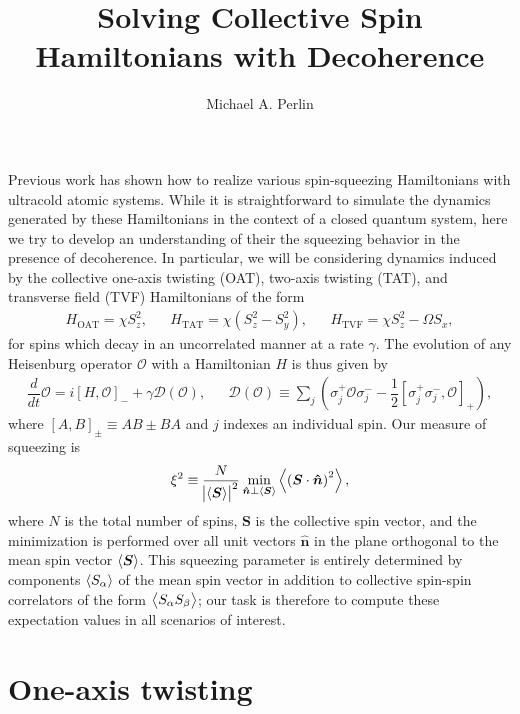 \documentclass[aps,notitlepage,nofootinbib,11pt]{revtex4-1}
\renewcommand{\t}{\text} %
\newcommand{\f}[2]{\dfrac{#1}{#2}} %
\newcommand{\p}[1]{\left(#1\right)} %
\renewcommand{\sp}[1]{\left[#1\right]} %
\renewcommand{\v}{\bm} %
\newcommand{\uv}[1]{\v{\hat{#1}}} %
\renewcommand{\c}{\cdot} %
\newcommand{\bk}{\Braket} %
\newcommand{\D}{\mathcal{D}}
\renewcommand{\O}{\mathcal{O}}
\newcommand{\1}{\mathds{1}}
\begin{document}
\title{Solving Collective Spin Hamiltonians with Decoherence}

\author{Michael A. Perlin}

\maketitle

Previous work has shown how to realize various spin-squeezing
Hamiltonians with ultracold atomic systems.  While it is
straightforward to simulate the dynamics generated by these
Hamiltonians in the context of a closed quantum system, here we try to
develop an understanding of their the squeezing behavior in the
presence of decoherence.  In particular, we will be considering
dynamics induced by the collective one-axis twisting (OAT), two-axis
twisting (TAT), and transverse field (TVF) Hamiltonians of the form
\begin{align}
  H_{\t{OAT}} = \chi S_z^2,
  &&
  H_{\t{TAT}} = \chi \p{S_z^2 - S_y^2},
  &&
  H_{\t{TVF}} = \chi S_z^2 - \Omega S_x,
\end{align}
for spins which decay in an uncorrelated manner at a rate $\gamma$.
The evolution of any Heisenburg operator $\O$ with a Hamiltonian $H$
is thus given by
\begin{align}
  \f{d}{dt} \O
  = i\sp{H,\O}_- + \gamma\D\p{\O},
  &&
  \D\p{\O} \equiv \sum_j\p{\sigma_j^+\O\sigma_j^-
    - \f12\sp{\sigma_j^+\sigma_j^-,\O}_+},
  \label{eq:EOM}
\end{align}
where $\sp{A,B}_\pm\equiv AB\pm BA$ and $j$ indexes an individual
spin.  Our measure of squeezing is
\begin{align}
  \xi^2 \equiv \f{N}{\abs{\bk{\v S}}^2}
  \min_{\uv n\perp\bk{\v S}} \bk{\p{\v S\c\uv n}^2},
  \label{eq:squeezing}
\end{align}
where $N$ is the total number of spins, $\v S$ is the collective spin
vector, and the minimization is performed over all unit vectors
$\uv n$ in the plane orthogonal to the mean spin vector $\bk{\v S}$.
This squeezing parameter is entirely determined by components
$\bk{S_\alpha}$ of the mean spin vector in addition to collective
spin-spin correlators of the form $\bk{S_\alpha S_\beta}$; our task is
therefore to compute these expectation values in all scenarios of
interest.


\section{One-axis twisting}
\end{document}
